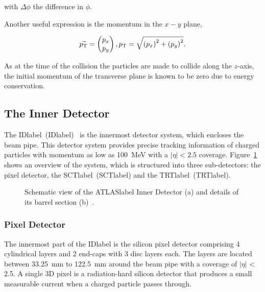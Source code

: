 with $\Delta\phi$ the difference in $\phi$.

Another useful expression is the momentum in the $x-y$ plane, 

\begin{equation}
    \vec{p_{\text{T}}} = \begin{pmatrix} p_x \\ p_y \end{pmatrix}, p_{\text{T}} = \sqrt{\left(p_x\right)^2+\left(p_y\right)^2}.
\end{equation}

As at the time of the collision the particles are made to collide along the $z$-axis, the initial momentum of the transverse plane is known to be zero due to energy conservation.

\subsection{The Inner Detector}

The \acrlong{IDlabel}~(\acrshort{IDlabel})~\cite{CERN-LHCC-97-016,Haywood:331064,Pixelupgrade} is the innermost detector system, which encloses the beam pipe. This detector system provides precise tracking information of charged particles with momentum as low as 100~MeV with a $|\eta|<2.5$ coverage. Figure~\ref{figLHC:ATLASID} shows an overview of the system, which is structured into three sub-detectors: the pixel detector, the \acrlong{SCTlabel}~(\acrshort{SCTlabel}) and the \acrlong{TRTlabel}~(\acrshort{TRTlabel}).

\begin{figure}[htbp]
    \RawFloats
    \begin{center}
    \quad
    \caption{
        Schematic view of the \acrshort{ATLASlabel} Inner Detector (a) and details of its barrel section (b)~\cite{Collaboration_2008}. 
    }
    \label{figLHC:ATLASID}
    \end{center}
\end{figure}

\subsubsection*{Pixel Detector}

The innermost part of the \acrshort{IDlabel} is the silicon pixel detector comprising 4 cylindrical layers and 2 end-caps with 3 disc layers each. The layers are located between 33.25~mm to 122.5~mm around the beam pipe with a coverage of $|\eta|$ < 2.5. A single 3D pixel is a radiation-hard silicon detector that produces a small measurable current when a charged particle passes through.\\

